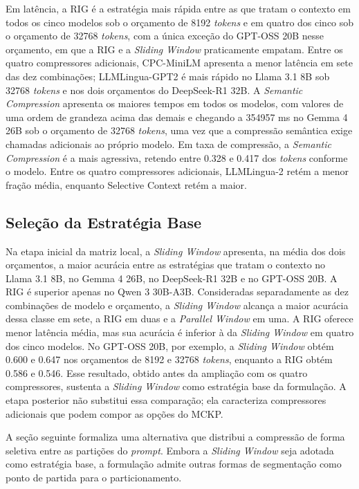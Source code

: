 Em latência, a RIG é a estratégia mais rápida entre as que tratam o contexto em todos os cinco modelos sob o orçamento de 8192 \textit{tokens} e em quatro dos cinco sob o orçamento de 32768 \textit{tokens}, com a única exceção do GPT-OSS 20B nesse orçamento, em que a RIG e a \textit{Sliding Window} praticamente empatam. Entre os quatro compressores adicionais, CPC-MiniLM apresenta a menor latência em sete das dez combinações; LLMLingua-GPT2 é mais rápido no Llama 3.1 8B sob 32768 \textit{tokens} e nos dois orçamentos do DeepSeek-R1 32B. A \textit{Semantic Compression} apresenta os maiores tempos em todos os modelos, com valores de uma ordem de grandeza acima das demais e chegando a 354957 ms no Gemma 4 26B sob o orçamento de 32768 \textit{tokens}, uma vez que a compressão semântica exige chamadas adicionais ao próprio modelo. Em taxa de compressão, a \textit{Semantic Compression} é a mais agressiva, retendo entre 0.328 e 0.417 dos \textit{tokens} conforme o modelo. Entre os quatro compressores adicionais, LLMLingua-2 retém a menor fração média, enquanto Selective Context retém a maior.


\subsection{Seleção da Estratégia Base}
\label{subsec:discussao-empirica}

Na etapa inicial da matriz local, a \textit{Sliding Window} apresenta, na média dos dois orçamentos, a maior acurácia entre as estratégias que tratam o contexto no Llama 3.1 8B, no Gemma 4 26B, no DeepSeek-R1 32B e no GPT-OSS 20B. A RIG é superior apenas no Qwen 3 30B-A3B. Consideradas separadamente as dez combinações de modelo e orçamento, a \textit{Sliding Window} alcança a maior acurácia dessa classe em sete, a RIG em duas e a \textit{Parallel Window} em uma. A RIG oferece menor latência média, mas sua acurácia é inferior à da \textit{Sliding Window} em quatro dos cinco modelos. No GPT-OSS 20B, por exemplo, a \textit{Sliding Window} obtém 0.600 e 0.647 nos orçamentos de 8192 e 32768 \textit{tokens}, enquanto a RIG obtém 0.586 e 0.546. Esse resultado, obtido antes da ampliação com os quatro compressores, sustenta a \textit{Sliding Window} como estratégia base da formulação. A etapa posterior não substitui essa comparação; ela caracteriza compressores adicionais que podem compor as opções do MCKP.

A seção seguinte formaliza uma alternativa que distribui a compressão de forma seletiva entre as partições do \textit{prompt}. Embora a \textit{Sliding Window} seja adotada como estratégia base, a formulação admite outras formas de segmentação como ponto de partida para o particionamento.

